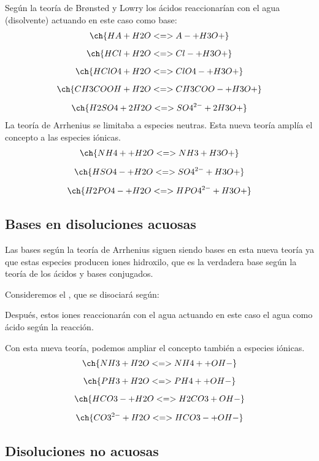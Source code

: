 Según la teoría de Br\o{}nsted y Lowry los ácidos reaccionarían con el agua (disolvente) actuando en este caso como base:
\begin{gather*}
    \ch{HA + H2O <=> A- + H3O+}\separ
    \ch{HCl + H2O <=> Cl- + H3O+}\separ
    \ch{HClO4 + H2O <=> ClO4- + H3O+}\separ
    \ch{CH3COOH + H2O <=> CH3COO- + H3O+}\separ
    \ch{H2SO4 + 2 H2O <=> SO4^{2-} + 2 H3O+}
\end{gather*}
La teoría de Arrhenius se limitaba a especies neutras.
Esta nueva teoría amplía el concepto a las especies iónicas.
\begin{gather*}
    \ch{NH4+ + H2O <=> NH3 + H3O+}\separ
    \ch{HSO4- + H2O <=> SO4^{2-} + H3O+}\separ
    \ch{H2PO4- + H2O <=> HPO4^{2-} + H3O+}
\end{gather*}

\subsection{Bases en disoluciones acuosas}\label{subsec:bases-en-disoluciones-acuosas}
Las bases según la teoría de Arrhenius siguen siendo bases en esta nueva teoría ya que estas especies producen iones hidroxilo, que es la verdadera base según la teoría de los ácidos y bases conjugados.

Consideremos el , que se disociará según:
\begin{centeredequation}
\end{centeredequation}

Después, estos iones  reaccionarán con el agua actuando en este caso el agua como ácido según la reacción.
\begin{centeredequation}
\end{centeredequation}


Con esta nueva teoría, podemos ampliar el concepto también a especies iónicas.
\begin{gather*}
    \ch{NH3 + H2O <=> NH4+ + OH-}\separ
    \ch{PH3 + H2O <=> PH4+ + OH-}\separ
    \ch{HCO3- + H2O <=> H2CO3 + OH-}\separ
    \ch{CO3^{2-} + H2O <=> HCO3- + OH-}
\end{gather*}

\subsection{Disoluciones no acuosas}\label{subsec:disoluciones-no-acuosas}

